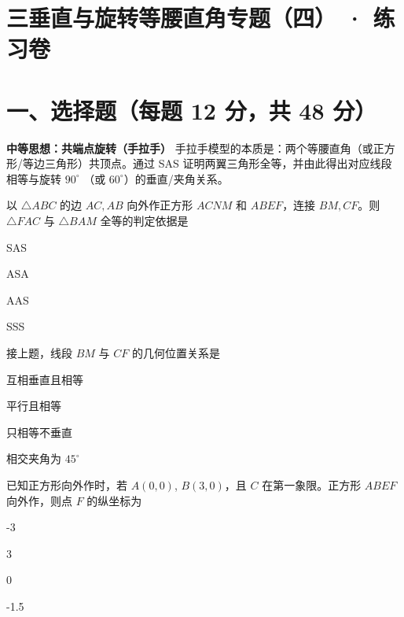\documentclass{exam-zh}
\begin{document}
\section*{三垂直与旋转等腰直角专题（四） · 练习卷}

\section*{一、选择题（每题 12 分，共 48 分）}


\begin{keyideabox}
  \textbf{中等思想：共端点旋转（手拉手）}
  手拉手模型的本质是：两个等腰直角（或正方形/等边三角形）共顶点。通过 SAS 证明两翼三角形全等，并由此得出对应线段相等与旋转 $90^\circ$ （或 $60^\circ$）的垂直/夹角关系。
\end{keyideabox}



\begin{question}[points=12]
  以 $\triangle ABC$ 的边 $AC, AB$ 向外作正方形 $ACNM$ 和 $ABEF$，连接 $BM, CF$。则 $\triangle FAC$ 与 $\triangle BAM$ 全等的判定依据是
  \begin{choices}
    \item SAS
    \item ASA
    \item AAS
    \item SSS
  \end{choices}
\end{question}



\begin{question}[points=12]
  接上题，线段 $BM$ 与 $CF$ 的几何位置关系是
  \begin{choices}
    \item 互相垂直且相等
    \item 平行且相等
    \item 只相等不垂直
    \item 相交夹角为 $45^\circ$
  \end{choices}
\end{question}



\begin{question}[points=12]
  已知正方形向外作时，若 $A(0,0)$, $B(3,0)$，且 $C$ 在第一象限。正方形 $ABEF$ 向外作，则点 $F$ 的纵坐标为
  \begin{choices}
    \item -3
    \item 3
    \item 0
    \item -1.5
  \end{choices}
\end{question}
\end{document}
